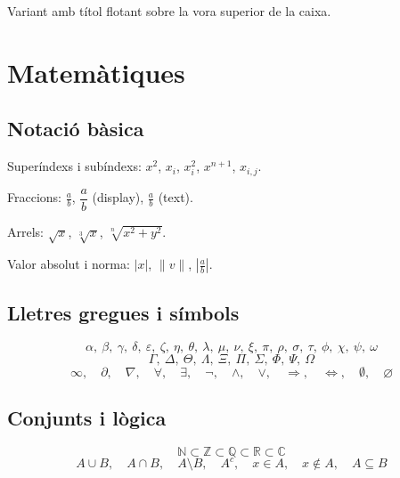 \documentclass[informe, catalan]{practicaitic}
\theoremstyle{definition}
\theoremstyle{remark}
\begin{document}
\vspace{0.4em}
\begin{tcolorbox}[enhanced, title=Resultat destacat,
  colback=myblue!8, colframe=myblue,
  attach boxed title to top left={yshift=-2mm, xshift=4mm},
  boxed title style={colback=myblue}, fonttitle=\bfseries\color{white}]
Variant amb títol flotant sobre la vora superior de la caixa.
\end{tcolorbox}


\section{Matemàtiques}

\subsection{Notació bàsica}

Superíndexs i subíndexs: $x^2$, $x_i$, $x_i^2$, $x^{n+1}$, $x_{i,j}$.

Fraccions: $\frac{a}{b}$, $\dfrac{a}{b}$ (display), $\tfrac{a}{b}$ (text).

Arrels: $\sqrt{x}$, $\sqrt[3]{x}$, $\sqrt[n]{x^2 + y^2}$.

Valor absolut i norma: $|x|$, $\|v\|$, $\left|\frac{a}{b}\right|$.

\subsection{Lletres gregues i símbols}

\[
\alpha,\ \beta,\ \gamma,\ \delta,\ \varepsilon,\ \zeta,\ \eta,\
\theta,\ \lambda,\ \mu,\ \nu,\ \xi,\ \pi,\ \rho,\ \sigma,\
\tau,\ \phi,\ \chi,\ \psi,\ \omega
\]
\[
\Gamma,\ \Delta,\ \Theta,\ \Lambda,\ \Xi,\ \Pi,\ \Sigma,\ \Phi,\ \Psi,\ \Omega
\]
\[
\infty,\quad \partial,\quad \nabla,\quad \forall,\quad \exists,\quad
\neg,\quad \land,\quad \lor,\quad \Rightarrow,\quad \Leftrightarrow,\quad
\emptyset,\quad \varnothing
\]

\subsection{Conjunts i lògica}

\[
\mathbb{N} \subset \mathbb{Z} \subset \mathbb{Q} \subset \mathbb{R} \subset \mathbb{C}
\]
\[
A \cup B, \quad A \cap B, \quad A \setminus B, \quad A^c, \quad
x \in A, \quad x \notin A, \quad A \subseteq B
\]
\end{document}
